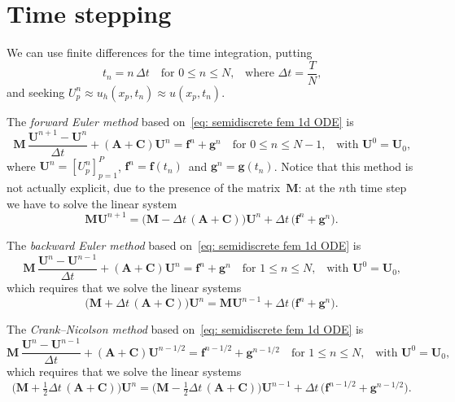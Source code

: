 \section{Time stepping}\label{sec: time stepping}
We can use finite differences for the time integration, putting
\[
t_n=n\,\Delta t\quad\text{for $0\le n\le N$,}
    \quad\text{where $\Delta t=\frac{T}{N}$,}
\]
and seeking $U^n_p\approx u_h(x_p,t_n)\approx u(x_p,t_n)$.

\begin{example}
The \emph{forward Euler method} based on~\eqref{eq: semidiscrete fem 1d ODE} is
\[
\boldsymbol{M}\,\frac{\boldsymbol{U}^{n+1}-\boldsymbol{U}^n}{\Delta t}
+(\boldsymbol{A}+\boldsymbol{C})\boldsymbol{U}^n=\boldsymbol{f}^n
    +\boldsymbol{g}^n\quad\text{for $0\le n\le N-1$,}
    \quad\text{with $\boldsymbol{U}^0=\boldsymbol{U}_0$,}
\]
where $\boldsymbol{U}^n=[U^n_p]_{p=1}^P$, 
$\boldsymbol{f}^n=\boldsymbol{f}(t_n)$~and 
$\boldsymbol{g}^n=\boldsymbol{g}(t_n)$.  Notice that this method is not 
actually explicit, due to the presence of the matrix~$\boldsymbol{M}$: at the 
$n$th time step we have to solve the linear system
\[
\boldsymbol{M}\boldsymbol{U}^{n+1}=\bigl(\boldsymbol{M}
-\Delta t\,(\boldsymbol{A}+\boldsymbol{C})\bigr)\boldsymbol{U}^n
    +\Delta t\,\bigl(\boldsymbol{f}^n+\boldsymbol{g}^n\bigr).
\]
\end{example}

\begin{example}
The \emph{backward Euler method} based on~\eqref{eq: semidiscrete fem 1d ODE} is
\[
\boldsymbol{M}\,\frac{\boldsymbol{U}^{n}-\boldsymbol{U}^{n-1}}{\Delta t}
+(\boldsymbol{A}+\boldsymbol{C})\boldsymbol{U}^n=\boldsymbol{f}^n
    +\boldsymbol{g}^n\quad\text{for $1\le n\le N$,}
    \quad\text{with $\boldsymbol{U}^0=\boldsymbol{U}_0$,}
\]
which requires that we solve the linear systems
\[
\bigl(\boldsymbol{M}+\Delta t\,(\boldsymbol{A}+\boldsymbol{C})\bigr) 
    \boldsymbol{U}^n=\boldsymbol{M}\boldsymbol{U}^{n-1}
    +\Delta t\,\bigl(\boldsymbol{f}^n+\boldsymbol{g}^n\bigr).
\]
\end{example}

\begin{example}
The \emph{Crank--Nicolson method} based on~\eqref{eq: semidiscrete fem 1d ODE} 
is
\[
\boldsymbol{M}\,\frac{\boldsymbol{U}^{n}-\boldsymbol{U}^{n-1}}{\Delta t}
+(\boldsymbol{A}+\boldsymbol{C})\boldsymbol{U}^{n-1/2}=\boldsymbol{f}^{n-1/2}
    +\boldsymbol{g}^{n-1/2}\quad\text{for $1\le n\le N$,}
    \quad\text{with $\boldsymbol{U}^0=\boldsymbol{U}_0$,}
\]
which requires that we solve the linear systems
\[
\bigl(\boldsymbol{M}+\tfrac12\Delta t\,(\boldsymbol{A}+\boldsymbol{C})\bigr) 
    \boldsymbol{U}^n
=\bigl(\boldsymbol{M}-\tfrac12\Delta t\,(\boldsymbol{A}+\boldsymbol{C})\bigr) 
    \boldsymbol{U}^{n-1}
    +\Delta t\,\bigl(\boldsymbol{f}^{n-1/2}+\boldsymbol{g}^{n-1/2}\bigr).
\]
\end{example}

